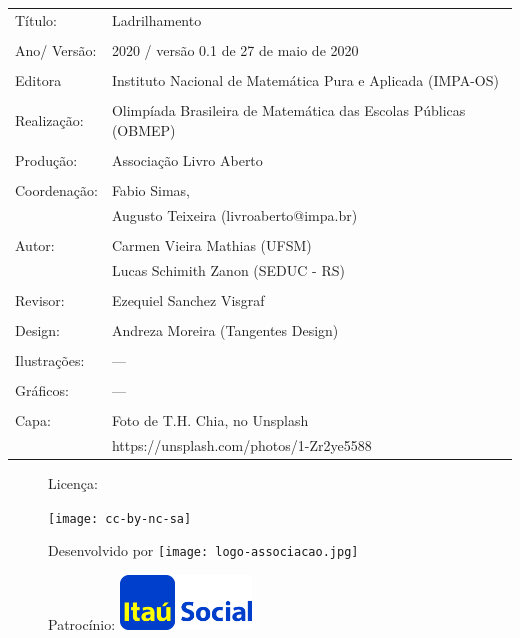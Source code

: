 \begin{tabular}{p{}p{}}
Título: & Ladrilhamento\\
\\
Ano/ Versão: & 2020 / versão 0.1 de 27 de maio de 2020\\
\\
Editora & Instituto Nacional de Matem\'atica Pura e Aplicada (IMPA-OS)\\
\\
Realização:& Olimp\'iada Brasileira de Matem\'atica das Escolas P\'ublicas (OBMEP)\\
\\
Produção:& Associação Livro Aberto\\
\\
Coordenação: & Fabio Simas, \\
			&  Augusto Teixeira (livroaberto@impa.br)\\
\\
  Autor: & Carmen Vieira Mathias (UFSM) \\
         & Lucas Schimith Zanon (SEDUC - RS) \\
\\
Revisor: & Ezequiel Sanchez Visgraf  \\
\\
Design: & Andreza Moreira (Tangentes Design) \\
\\
  Ilustrações: & --- \\ 
\\
Gráficos: & --- \\
\\
  Capa: & Foto de T.H. Chia, no Unsplash \\
  		& https://unsplash.com/photos/1-Zr2ye5588 \\

\end{tabular}


\begin{figure}[b]
\begin{minipage}[l]{5cm}
\centering

{\large Licença:}

  \texttt{[image: cc-by-nc-sa]}
\end{minipage}\hfill
\begin{minipage}[c]{5cm}
\centering
{\large Desenvolvido por}
\texttt{[image: logo-associacao.jpg]}
\end{minipage}
\begin{minipage}[r]{5cm}
\centering

{\large Patrocínio:}
  \vspace{1em}
  \includegraphics[width=3.5cm]{itau}
\end{minipage}
\end{figure}

